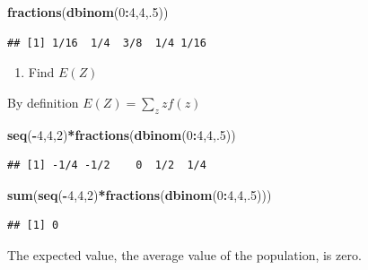 \documentclass[]{book}
\newenvironment{Shaded}{\begin{snugshade}}{\end{snugshade}}
\newcommand{\KeywordTok}[1]{\textcolor[rgb]{0.13,0.29,0.53}{\textbf{#1}}}
\newcommand{\DecValTok}[1]{\textcolor[rgb]{0.00,0.00,0.81}{#1}}
\newcommand{\OperatorTok}[1]{\textcolor[rgb]{0.81,0.36,0.00}{\textbf{#1}}}
\newcommand{\NormalTok}[1]{#1}
\providecommand{\tightlist}{%
  \setlength{\itemsep}{0pt}\setlength{\parskip}{0pt}}
\theoremstyle{definition}
\theoremstyle{definition}
\theoremstyle{definition}
\theoremstyle{remark}
\begin{document}
\begin{Shaded}
\begin{Highlighting}[]
\KeywordTok{fractions}\NormalTok{(}\KeywordTok{dbinom}\NormalTok{(}\DecValTok{0}\OperatorTok{:}\DecValTok{4}\NormalTok{,}\DecValTok{4}\NormalTok{,.}\DecValTok{5}\NormalTok{))}
\end{Highlighting}
\end{Shaded}

\begin{verbatim}
## [1] 1/16  1/4  3/8  1/4 1/16
\end{verbatim}

\begin{enumerate}
\def\labelenumi{\arabic{enumi}.}
\tightlist
\item
  Find \(E(Z)\)
\end{enumerate}

By definition \(E(Z)=\sum_{z}zf(z)\)

\begin{Shaded}
\begin{Highlighting}[]
\KeywordTok{seq}\NormalTok{(}\OperatorTok{-}\DecValTok{4}\NormalTok{,}\DecValTok{4}\NormalTok{,}\DecValTok{2}\NormalTok{)}\OperatorTok{*}\KeywordTok{fractions}\NormalTok{(}\KeywordTok{dbinom}\NormalTok{(}\DecValTok{0}\OperatorTok{:}\DecValTok{4}\NormalTok{,}\DecValTok{4}\NormalTok{,.}\DecValTok{5}\NormalTok{))}
\end{Highlighting}
\end{Shaded}

\begin{verbatim}
## [1] -1/4 -1/2    0  1/2  1/4
\end{verbatim}

\begin{Shaded}
\begin{Highlighting}[]
\KeywordTok{sum}\NormalTok{(}\KeywordTok{seq}\NormalTok{(}\OperatorTok{-}\DecValTok{4}\NormalTok{,}\DecValTok{4}\NormalTok{,}\DecValTok{2}\NormalTok{)}\OperatorTok{*}\KeywordTok{fractions}\NormalTok{(}\KeywordTok{dbinom}\NormalTok{(}\DecValTok{0}\OperatorTok{:}\DecValTok{4}\NormalTok{,}\DecValTok{4}\NormalTok{,.}\DecValTok{5}\NormalTok{)))}
\end{Highlighting}
\end{Shaded}

\begin{verbatim}
## [1] 0
\end{verbatim}

The expected value, the average value of the population, is zero.
\end{document}
